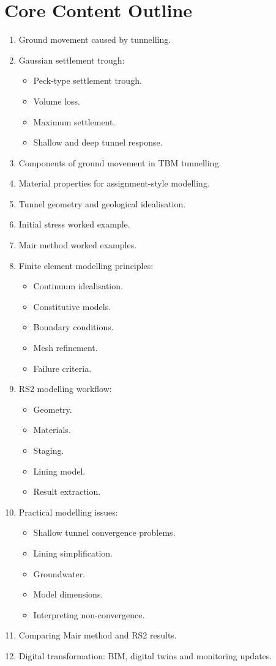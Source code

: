 \documentclass[12pt,oneside]{book}
\begin{document}
\section{Core Content Outline}
\begin{enumerate}
    \item Ground movement caused by tunnelling.
    \item Gaussian settlement trough:
    \begin{itemize}
        \item Peck-type settlement trough.
        \item Volume loss.
        \item Maximum settlement.
        \item Shallow and deep tunnel response.
    \end{itemize}
    \item Components of ground movement in TBM tunnelling.
    \item Material properties for assignment-style modelling.
    \item Tunnel geometry and geological idealisation.
    \item Initial stress worked example.
    \item Mair method worked examples.
    \item Finite element modelling principles:
    \begin{itemize}
        \item Continuum idealisation.
        \item Constitutive models.
        \item Boundary conditions.
        \item Mesh refinement.
        \item Failure criteria.
    \end{itemize}
    \item RS2 modelling workflow:
    \begin{itemize}
        \item Geometry.
        \item Materials.
        \item Staging.
        \item Lining model.
        \item Result extraction.
    \end{itemize}
    \item Practical modelling issues:
    \begin{itemize}
        \item Shallow tunnel convergence problems.
        \item Lining simplification.
        \item Groundwater.
        \item Model dimensions.
        \item Interpreting non-convergence.
    \end{itemize}
    \item Comparing Mair method and RS2 results.
    \item Digital transformation: BIM, digital twins and monitoring updates.
\end{enumerate}
\end{document}
